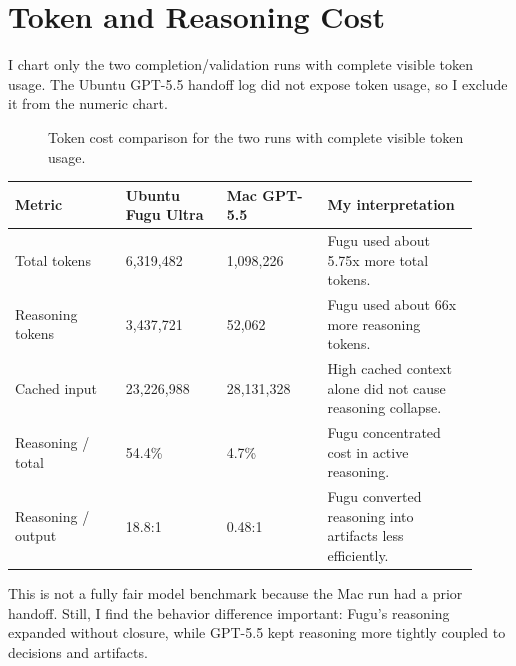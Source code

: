 \documentclass[a4paper,11pt]{article}
\begin{document}
\section{Token and Reasoning Cost}

I chart only the two completion/validation runs with complete visible token usage. The Ubuntu GPT-5.5 handoff log did not expose token usage, so I exclude it from the numeric chart.

\begin{figure}[htbp]
\centering
{}
\caption{Token cost comparison for the two runs with complete visible token usage.}
\end{figure}

\begin{longtable}{L{0.22\linewidth} L{0.20\linewidth} L{0.20\linewidth} L{0.30\linewidth}}
\toprule
Metric & Ubuntu Fugu Ultra & Mac GPT-5.5 & My interpretation\\
\midrule
Total tokens & 6,319,482 & 1,098,226 & Fugu used about 5.75x more total tokens.\\
Reasoning tokens & 3,437,721 & 52,062 & Fugu used about 66x more reasoning tokens.\\
Cached input & 23,226,988 & 28,131,328 & High cached context alone did not cause reasoning collapse.\\
Reasoning / total & 54.4\% & 4.7\% & Fugu concentrated cost in active reasoning.\\
Reasoning / output & 18.8:1 & 0.48:1 & Fugu converted reasoning into artifacts less efficiently.\\
\bottomrule
\end{longtable}

This is not a fully fair model benchmark because the Mac run had a prior handoff. Still, I find the behavior difference important: Fugu's reasoning expanded without closure, while GPT-5.5 kept reasoning more tightly coupled to decisions and artifacts.
\end{document}
